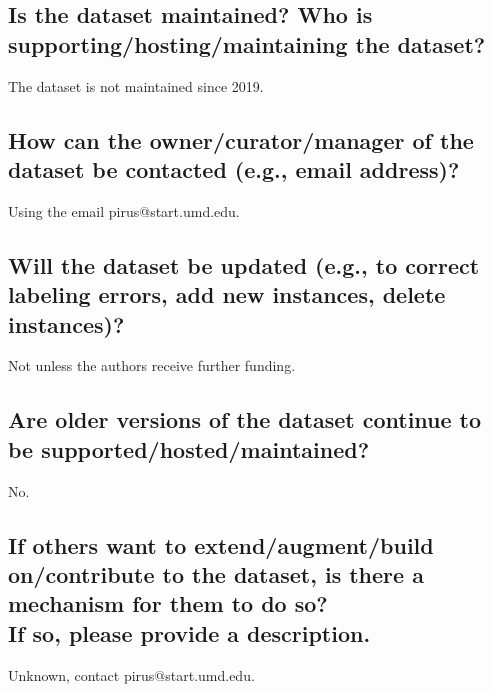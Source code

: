 \documentclass[letterpaper, 10 pt, conference]{ieeeconf}  %
\newcommand{\subtitle}[1]{{\\ \small \normalfont \color{purple} #1}}
\begin{document}
\subsection{Is the dataset maintained? Who is supporting/hosting/maintaining the dataset?}

The dataset is not maintained since 2019.

\subsection{How can the owner/curator/manager of the dataset be contacted (e.g., email address)?}

Using the email pirus@start.umd.edu.

\subsection{Will the dataset be updated (e.g., to correct labeling errors, add new instances, delete instances)?}

Not unless the authors receive further funding.

\subsection{Are older versions of the dataset continue to be supported/hosted/maintained?}

No.

\subsection{If others want to extend/augment/build on/contribute to the dataset, is there a mechanism for them to do so? \subtitle{If so, please provide a description.}}

Unknown, contact pirus@start.umd.edu.

\medskip
 
  

\end{document}
